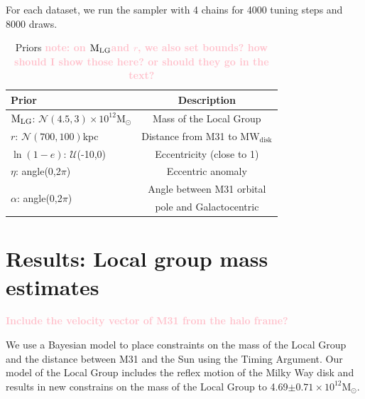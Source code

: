 \documentclass[twocolumn]{aastex631}
\newcommand{\kc}[1]{\textcolor{pink}{\textbf{#1}} }
\newcommand{\mlg}{\ensuremath{\textrm{M}_{\rm LG}}}
\newcommand{\msun}{\ensuremath{\textrm{M}_{\odot}}}
\newcommand{\mwdisk}{\ensuremath{\textrm{MW}_\textrm{disk}}}
\begin{document}
For each dataset, we run the sampler with 4 chains for 4000 tuning steps and
8000 draws.


\begin{table}
  \centering
  \begin{tabular}{lc}
  \hline\hline
  Prior  & Description \\\hline
  \mlg: $\mathcal{N}(4.5,3)\times10^{12}\msun$ & Mass of the Local Group\\
  $r$: $\mathcal{N}(700,100)$kpc & Distance from M31 to $\mwdisk$\\
  $\ln(1-e)$: $\mathcal{U}$(-10,0) & Eccentricity (close to 1) \\
  $\eta$: angle(0,2$\pi$)& Eccentric anomaly\\
  \multirow{2}{*}{$\alpha$: angle(0,2$\pi$)} & Angle between M31 orbital\\
  & pole and Galactocentric\\
  \hline\hline
  \end{tabular}
  \caption{\label{table:priors}Priors \kc{note: on \mlg and $r$, we also set bounds? how should I show those here? or should they go in the text?}}
\end{table}


\section{Results: Local group mass estimates}
\label{sec:results}
\kc{Include the velocity vector of M31 from the halo frame?}


We use a Bayesian model to place constraints on the mass of the Local Group and the distance between M31 and the Sun using the Timing Argument. Our model of the Local Group includes the reflex motion of the Milky Way disk and results in new constrains on the mass of the Local Group to 4.69$\pm0.71 \times 10^{12}\msun$.
\end{document}
